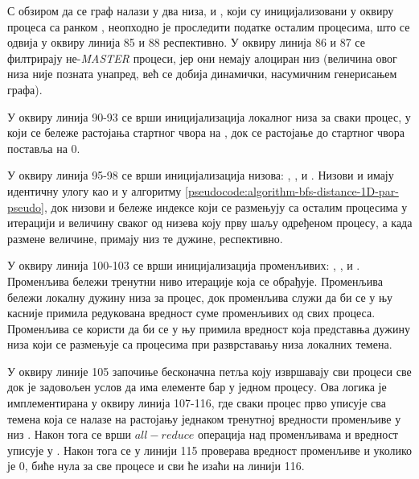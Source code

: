 \par
С обзиром да се граф налази у два низа,  и , који су иницијализовани у оквиру процеса са ранком , неопходно је проследити податке осталим процесима, што се одвија у оквиру линија 85 и 88 респективно. У оквиру линија 86 и 87 се филтрирају не-\textit{MASTER} процеси, јер они немају алоциран низ  (величина овог низа није позната унапред, већ се добија динамички, насумичним генерисањем графа).

\par
У оквиру линија 90-93 се врши иницијализација локалног низа за сваки процес, у који се бележе растојања стартног чвора на , док се растојање до стартног чвора поставља на $0$.

\par
У оквиру линија 95-98 се врши иницијализација низова: , ,  и . Низови  и имају идентичну улогу као и у алгоритму \ref{pseudocode:algorithm-bfs-distance-1D-par-pseudo}, док низови  и  бележе индексе који се размењују са осталим процесима у итерацији и величину сваког од низева коју прву шаљу одређеном процесу, а када размене величине, примају низ те дужине, респективно.

\par
У оквиру линија 100-103 се врши иницијализација променљивих: , ,  и . Променљива  бележи тренутни ниво итерације која се обрађује. Променљива  бележи локалну дужину низа  за процес, док променљива  служи да би се у њу касније примила редукована вредност суме  променљивих од свих процеса. Променљива  се користи да би се у њу примила вредност која представња дужину низа који се размењује са процесима при разврставању низа локалних темена.

\par
У оквиру линије 105 започиње бесконачна  петља коју извршавају сви процеси све док је задовољен услов да  има елементе бар у једном процесу. Ова логика је имплементирана у оквиру линија 107-116, где сваки процес прво уписује сва темена која се налазе на растојању једнаком тренутној вредности променљиве  у низ . Након тога се врши $all-reduce$ операција над променљивама  и вредност уписује у . Након тога се у линији 115 проверава вредност променљиве  и уколико је $0$, биће нула за све процесе и сви ће изаћи на линији 116.

